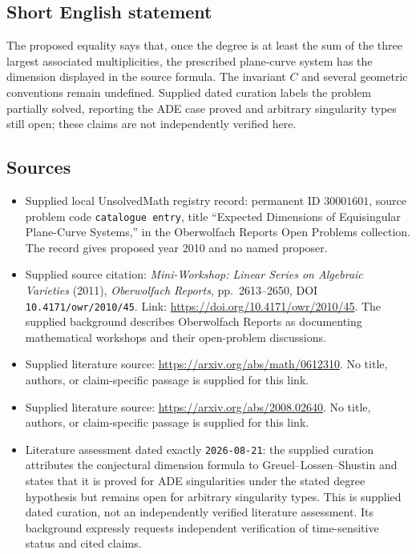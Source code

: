 \documentclass[11pt]{article}
\begin{document}
\subsection{Short English statement}
The proposed equality says that, once the degree is at least the sum of the three largest associated multiplicities, the prescribed plane-curve system has the dimension displayed in the source formula. The invariant \(C\) and several geometric conventions remain undefined. Supplied dated curation labels the problem partially solved, reporting the ADE case proved and arbitrary singularity types still open; these claims are not independently verified here.
\subsection{Sources}
\begin{itemize}
\item Supplied local UnsolvedMath registry record: permanent ID \(30001601\), source problem code \texttt{catalogue entry}, title ``Expected Dimensions of Equisingular Plane-Curve Systems,'' in the Oberwolfach Reports Open Problems collection. The record gives proposed year 2010 and no named proposer.
\item Supplied source citation: \emph{Mini-Workshop: Linear Series on Algebraic Varieties} (2011), \emph{Oberwolfach Reports}, pp.\ 2613--2650, DOI \texttt{10.4171/owr/2010/45}. Link: \url{https://doi.org/10.4171/owr/2010/45}. The supplied background describes Oberwolfach Reports as documenting mathematical workshops and their open-problem discussions.
\item Supplied literature source: \url{https://arxiv.org/abs/math/0612310}. No title, authors, or claim-specific passage is supplied for this link.
\item Supplied literature source: \url{https://arxiv.org/abs/2008.02640}. No title, authors, or claim-specific passage is supplied for this link.
\item Literature assessment dated exactly \texttt{2026-08-21}: the supplied curation attributes the conjectural dimension formula to Greuel--Lossen--Shustin and states that it is proved for ADE singularities under the stated degree hypothesis but remains open for arbitrary singularity types. This is supplied dated curation, not an independently verified literature assessment. Its background expressly requests independent verification of time-sensitive status and cited claims.
\end{itemize}
\end{document}
